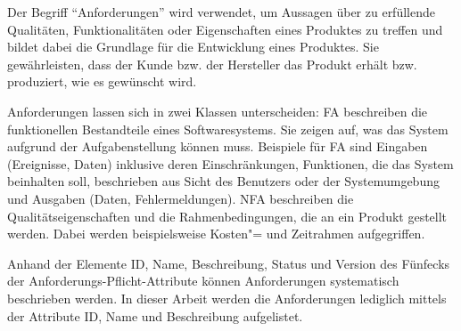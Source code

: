 Der Begriff \enquote{Anforderungen} wird verwendet, um Aussagen über zu erfüllende Qualitäten, Funktionalitäten oder Eigenschaften eines Produktes zu treffen und bildet dabei die Grundlage für die Entwicklung eines Produktes.
Sie gewährleisten, dass der Kunde bzw. der Hersteller das Produkt erhält bzw. produziert, wie es gewünscht wird.\unskip{}

Anforderungen lassen sich in zwei Klassen unterscheiden:
\ac{FA} beschreiben die funktionellen Bestandteile eines Softwaresystems.
Sie zeigen auf, was das System aufgrund der Aufgabenstellung können muss.
Beispiele für \ac{FA} sind Eingaben (Ereignisse, Daten) inklusive deren Einschränkungen, Funktionen, die das System beinhalten soll, beschrieben aus Sicht des Benutzers oder der Systemumgebung und Ausgaben (Daten, Fehlermeldungen).
\ac{NFA} beschreiben die Qualitätseigenschaften und die Rahmenbedingungen, die an ein Produkt gestellt werden.
Dabei werden beispielsweise Kosten"= und Zeitrahmen aufgegriffen.

Anhand der Elemente ID, Name, Beschreibung, Status und Version des Fünfecks der Anforderungs-Pflicht-Attribute können Anforderungen systematisch beschrieben werden.
In dieser Arbeit werden die Anforderungen lediglich mittels der Attribute ID, Name und Beschreibung aufgelistet.


